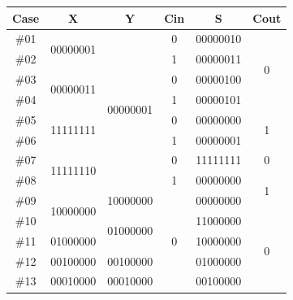 \documentclass{report}
\begin{document}
\begin{longtable}[here,width=\textwidth]{|c|c|c|c|c|c|}
                \hline
                Case & X                         & Y                         & Cin                & S        & Cout               \\ \hline
                \#01 & \multirow{2}{*}{00000001} & \multirow{8}{*}{00000001} & 0                  & 00000010 & \multirow{4}{*}{0} \\ \cline{1-1} \cline{4-5}
                \#02 &                           &                           & 1                  & 00000011 &                    \\ \cline{1-2} \cline{4-5}
                \#03 & \multirow{2}{*}{00000011} &                           & 0                  & 00000100 &                    \\ \cline{1-1} \cline{4-5}
                \#04 &                           &                           & 1                  & 00000101 &                    \\ \cline{1-2} \cline{4-6} 
                \#05 & \multirow{2}{*}{11111111} &                           & 0                  & 00000000 & \multirow{2}{*}{1} \\ \cline{1-1} \cline{4-5}
                \#06 &                           &                           & 1                  & 00000001 &                    \\ \cline{1-2} \cline{4-6} 
                \#07 & \multirow{2}{*}{11111110} &                           & 0                  & 11111111 & 0                  \\ \cline{1-1} \cline{4-6} 
                \#08 &                           &                           & 1                  & 00000000 & \multirow{2}{*}{1} \\ \cline{1-5}
                \#09 & \multirow{2}{*}{10000000} & 10000000                  & \multirow{8}{*}{0} & 00000000 &                    \\ \cline{1-1} \cline{3-3} \cline{5-6} 
                \#10 &                           & \multirow{2}{*}{01000000} &                    & 11000000 & \multirow{7}{*}{0} \\ \cline{1-2} \cline{5-5}
                \#11 & 01000000                  &                           &                    & 10000000 &                    \\ \cline{1-3} \cline{5-5}
                \#12 & 00100000                  & 00100000                  &                    & 01000000 &                    \\ \cline{1-3} \cline{5-5}
                \#13 & 00010000                  & 00010000                  &                    & 00100000 &                    \\ \cline{1-3} \cline{5-5}

\end{longtable}
\end{document}
